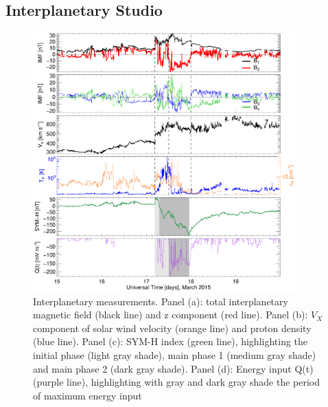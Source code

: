 \documentclass[a4paper]{article}
\theoremstyle{plain}
\theoremstyle{definition}
\begin{document}
	\subsection{Interplanetary Studio}
\begin{figure}
	\centering
	\includegraphics[width=0.9\textwidth]{fig/ip_2015-03-15_2015-03-19.eps}
	\caption{Interplanetary measurements. Panel (a): total interplanetary magnetic field (black line) and z component (red line). Panel (b): $V_X$ component of solar wind velocity (orange line) and proton density (blue line). Panel (c): SYM-H index (green line), highlighting the initial phase (light gray shade), main phase 1 (medium gray shade) and main phase 2 (dark gray shade). Panel (d): Energy input Q(t) (purple line), highlighting with gray and dark gray shade the period of maximum energy input}
	\label{fig:ip}
\end{figure}	
	
\end{document}
